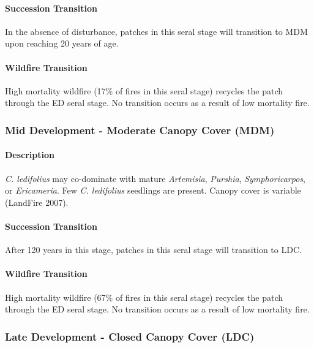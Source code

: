 \paragraph{Succession Transition} In the absence of disturbance, patches in this seral stage will transition to MDM upon reaching 20 years of age. 

\paragraph{Wildfire Transition} High mortality wildfire (17\% of fires in this seral stage) recycles the patch through the ED seral stage. No transition occurs as a result of low mortality fire.

\noindent\hrulefill


\subsubsection{Mid Development - Moderate Canopy Cover (MDM)}

\paragraph{Description} \emph{C. ledifolius} may co-dominate with mature \emph{Artemisia}, \emph{Purshia}, \emph{Symphoricarpos}, or \emph{Ericameria}. Few \emph{C. ledifolius} seedlings are present. Canopy cover is variable (LandFire 2007).

\paragraph{Succession Transition} After 120 years in this stage, patches in this seral stage will transition to LDC.

\paragraph{Wildfire Transition} High mortality wildfire (67\% of fires in this seral stage) recycles the patch through the ED seral stage. No transition occurs as a result of low mortality fire.

\noindent\hrulefill


\subsubsection{Late Development - Closed Canopy Cover (LDC)}

